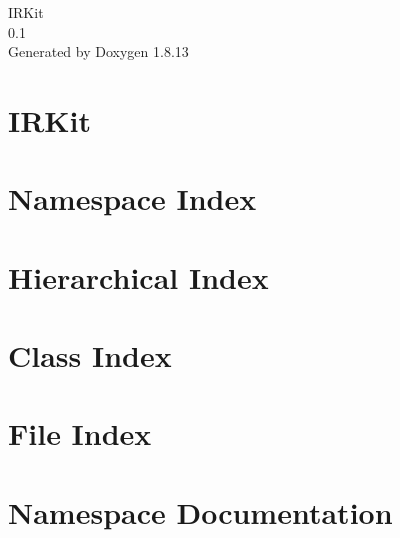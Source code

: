 \documentclass[twoside]{book}
\newcommand{\+}{\discretionary{\mbox{\scriptsize$\hookleftarrow$}}{}{}}
\newcommand{\clearemptydoublepage}{%
  \newpage{\pagestyle{empty}\cleardoublepage}%
}
\begin{document}
\hypersetup{pageanchor=false,
             bookmarksnumbered=true,
             pdfencoding=unicode
            }
\begin{titlepage}
\vspace*{7cm}
\begin{center}%
{\Large I\+R\+Kit \\[1ex]\large 0.\+1 }\\
\vspace*{1cm}
{\large Generated by Doxygen 1.8.13}\\
\end{center}
\end{titlepage}
\clearemptydoublepage
{}
\tableofcontents
\clearemptydoublepage
{}
\hypersetup{pageanchor=true}

\chapter{I\+R\+Kit}
\label{index}\hypertarget{index}{}
\chapter{Namespace Index}

\chapter{Hierarchical Index}

\chapter{Class Index}

\chapter{File Index}

\chapter{Namespace Documentation}









\end{document}
